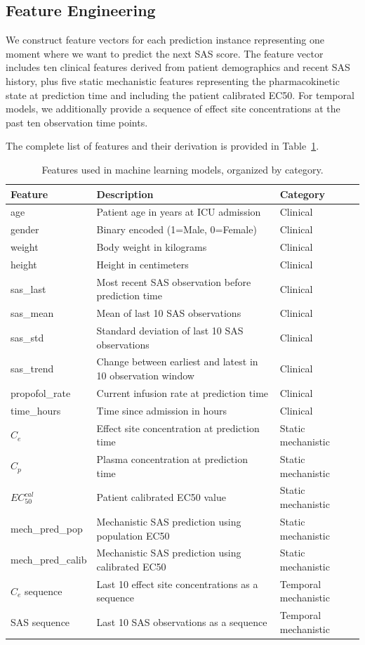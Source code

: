 \documentclass[11pt,a4paper]{article}
\begin{document}
\subsection{Feature Engineering}

We construct feature vectors for each prediction instance representing
one moment where we want to predict the next SAS score. The feature
vector includes ten clinical features derived from patient demographics
and recent SAS history, plus five static mechanistic features representing
the pharmacokinetic state at prediction time and including the patient
calibrated EC50. For temporal models, we additionally provide a sequence
of effect site concentrations at the past ten observation time points.

The complete list of features and their derivation is provided in
Table~\ref{tab:features}.

\begin{table}[H]
\centering
\caption{Features used in machine learning models, organized by category.}
\label{tab:features}
\begin{tabularx}{\textwidth}{lXl}
\toprule
Feature & Description & Category \\
\midrule
age & Patient age in years at ICU admission & Clinical \\
gender & Binary encoded (1=Male, 0=Female) & Clinical \\
weight & Body weight in kilograms & Clinical \\
height & Height in centimeters & Clinical \\
sas\_last & Most recent SAS observation before prediction time & Clinical \\
sas\_mean & Mean of last 10 SAS observations & Clinical \\
sas\_std & Standard deviation of last 10 SAS observations & Clinical \\
sas\_trend & Change between earliest and latest in 10 observation window & Clinical \\
propofol\_rate & Current infusion rate at prediction time & Clinical \\
time\_hours & Time since admission in hours & Clinical \\
\midrule
$C_e$ & Effect site concentration at prediction time & Static mechanistic \\
$C_p$ & Plasma concentration at prediction time & Static mechanistic \\
$EC_{50}^{cal}$ & Patient calibrated EC50 value & Static mechanistic \\
mech\_pred\_pop & Mechanistic SAS prediction using population EC50 & Static mechanistic \\
mech\_pred\_calib & Mechanistic SAS prediction using calibrated EC50 & Static mechanistic \\
\midrule
$C_e$ sequence & Last 10 effect site concentrations as a sequence & Temporal mechanistic \\
SAS sequence & Last 10 SAS observations as a sequence & Temporal mechanistic \\
\bottomrule
\end{tabularx}
\end{table}
\end{document}
